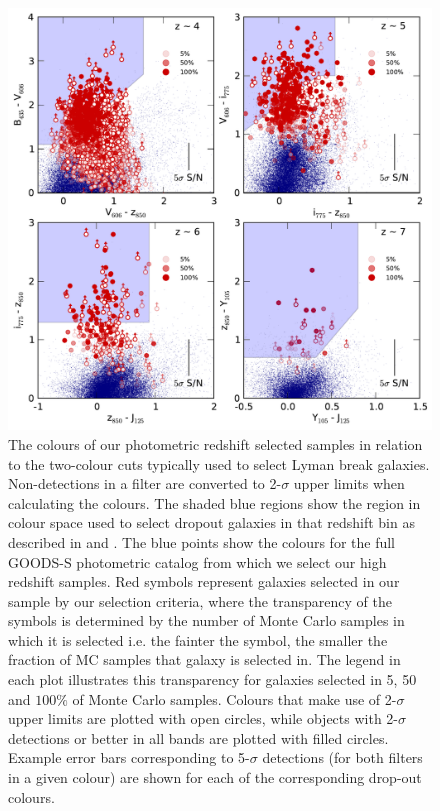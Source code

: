 \begin{figure}
\includegraphics[width=140mm]{plots/fig2.pdf}
\caption[The colours of photometric redshift selected samples in relation to the two-colour cuts typically used to select Lyman break galaxies.]{The colours of our photometric redshift selected samples in relation to the two-colour cuts typically used to select Lyman break galaxies. Non-detections in a filter are converted to 2-$\sigma$ upper limits when calculating the colours. The shaded blue regions show the region in colour space used to select dropout galaxies in that redshift bin as described in  \citet{2007ApJ...670..928B} and \citet{2012ApJ...754...83B}. The blue points show the colours for the full GOODS-S photometric catalog from which we select our high redshift samples. Red symbols represent galaxies selected in our sample by our selection criteria, where the transparency of the symbols is determined by the number of Monte Carlo samples in which it is selected i.e. the fainter the symbol, the smaller the fraction of MC samples that galaxy is selected in. The legend in each plot illustrates this transparency for galaxies selected in 5, 50 and $100\%$ of Monte Carlo samples. Colours that make use of 2-$\sigma$ upper limits are plotted with open circles, while objects with 2-$\sigma$ detections or better in all bands are plotted with filled circles. Example error bars corresponding to 5-$\sigma$ detections (for both filters in a given colour) are shown for each of the corresponding drop-out colours.}
\label{smf-fig:colours}
\end{figure}

